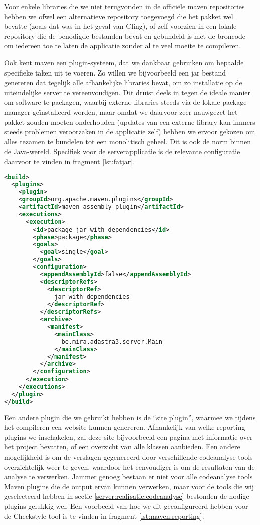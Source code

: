 Voor enkele libraries die we niet terugvonden in de officiële \ac{maven} repositories hebben we ofwel een alternatieve repository toegevoegd die het pakket wel bevatte (zoals dat was in het geval van Cling), of zelf voorzien in een lokale repository die de benodigde bestanden bevat en gebundeld is met de broncode om iedereen toe te laten de applicatie zonder al te veel moeite te compileren.

Ook kent \ac{maven} een plugin-systeem, dat we dankbaar gebruiken om bepaalde specifieke taken uit te voeren. Zo willen we bijvoorbeeld een \ac{jar} bestand genereren dat tegelijk alle afhankelijke libraries bevat, om zo installatie op de uiteindelijke server te vereenvoudigen. Dit druist deels in tegen de ideale manier om software te packagen, waarbij externe libraries steeds via de lokale package-manager geïnstalleerd worden, maar omdat we daarvoor zeer nauwgezet het pakket zouden moeten onderhouden (updates van een externe library kan immers steeds problemen veroorzaken in de applicatie zelf) hebben we ervoor gekozen om alles tezamen te bundelen tot een monolitisch geheel. Dit is ook de norm binnen de Java-wereld. Specifiek voor de serverapplicatie is de relevante configuratie daarvoor te vinden in fragment \ref{lst:fatjar}.

\begin{lstlisting}[language=XML, float, caption=Gebruik van Maven modules om een executable te compileren., label=lst:fatjar]
<build>
  <plugins>
    <plugin>
    <groupId>org.apache.maven.plugins</groupId>
    <artifactId>maven-assembly-plugin</artifactId>
    <executions>
      <execution>
        <id>package-jar-with-dependencies</id>
        <phase>package</phase>
        <goals>
          <goal>single</goal>
        </goals>
        <configuration>
          <appendAssemblyId>false</appendAssemblyId>
          <descriptorRefs>
            <descriptorRef>
              jar-with-dependencies
            </descriptorRef>
          </descriptorRefs>
          <archive>
            <manifest>
              <mainClass>
                be.mira.adastra3.server.Main
              </mainClass>
            </manifest>
          </archive>
        </configuration>
      </execution>
    </executions>
  </plugin>
</build>
\end{lstlisting}

Een andere plugin die we gebruikt hebben is de ``site plugin'', waarmee we tijdens het compileren een website kunnen genereren. Afhankelijk van welke reporting-plugins we inschakelen, zal deze site bijvoorbeeld een pagina met informatie over het project bevatten, of een overzicht van alle klassen aanbieden. Een andere mogelijkheid is om de verslagen gegenereerd door verschillende codeanalyse tools overzichtelijk weer te geven, waardoor het eenvoudiger is om de resultaten van de analyse te verwerken. Jammer genoeg bestaan er niet voor alle codeanalyse tools Maven plugins die de output ervan kunnen verwerken, maar voor de tools die wij geselecteerd hebben in sectie \ref{server:realisatie:codeanalyse} bestonden de nodige plugins gelukkig wel. Een voorbeeld van hoe we dit geconfigureerd hebben voor de Checkstyle tool is te vinden in fragment \ref{lst:maven:reporting}.

